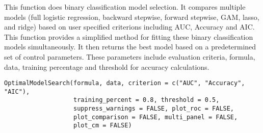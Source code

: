 \documentclass[a4paper]{book}
\begin{document}
%
\begin{Description}
This function does binary classification model selection. It compares multiple models (full logistic regression, backward stepwise, forward stepwise, GAM, lasso, and ridge) based on user specified criterions including AUC, Accuracy and AIC. This function provides a simplified method for fitting these binary classification models simultaneously. It then returns the best model based on a predetermined set of control parameters. These parameters include evaluation criteria, formula, data, training percentage and threshold for accuracy calculations.
\end{Description}
%
\begin{Usage}
\begin{verbatim}
OptimalModelSearch(formula, data, criterion = c("AUC", "Accuracy", "AIC"),
                   training_percent = 0.8, threshold = 0.5, 
                   suppress_warnings = FALSE, plot_roc = FALSE, 
                   plot_comparison = FALSE, multi_panel = FALSE, 
                   plot_cm = FALSE)

\end{verbatim}
\end{Usage}
%
\end{document}
